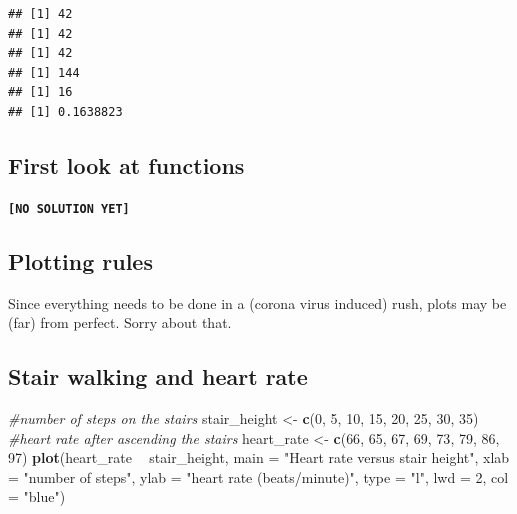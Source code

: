 \documentclass[]{book}
\newenvironment{Shaded}{\begin{snugshade}}{\end{snugshade}}
\newcommand{\CommentTok}[1]{\textcolor[rgb]{0.56,0.35,0.01}{\textit{#1}}}
\newcommand{\DataTypeTok}[1]{\textcolor[rgb]{0.13,0.29,0.53}{#1}}
\newcommand{\DecValTok}[1]{\textcolor[rgb]{0.00,0.00,0.81}{#1}}
\newcommand{\KeywordTok}[1]{\textcolor[rgb]{0.13,0.29,0.53}{\textbf{#1}}}
\newcommand{\NormalTok}[1]{#1}
\newcommand{\OperatorTok}[1]{\textcolor[rgb]{0.81,0.36,0.00}{\textbf{#1}}}
\newcommand{\StringTok}[1]{\textcolor[rgb]{0.31,0.60,0.02}{#1}}
\begin{document}
\begin{verbatim}
## [1] 42
## [1] 42
## [1] 42
## [1] 144
## [1] 16
## [1] 0.1638823
\end{verbatim}

\hypertarget{first-look-at-functions-1}{%
\subsection{First look at functions}\label{first-look-at-functions-1}}

\textbf{\texttt{{[}NO\ SOLUTION\ YET{]}}}

\hypertarget{plotting-rules-1}{%
\subsection*{Plotting rules}\label{plotting-rules-1}}

Since everything needs to be done in a (corona virus induced) rush, plots may be (far) from perfect. Sorry about that.

\hypertarget{stair-walking-and-heart-rate-1}{%
\subsection{Stair walking and heart rate}\label{stair-walking-and-heart-rate-1}}

\begin{Shaded}
\begin{Highlighting}[]
\CommentTok{#number of steps on the stairs}
\NormalTok{stair_height <-}\StringTok{ }\KeywordTok{c}\NormalTok{(}\DecValTok{0}\NormalTok{, }\DecValTok{5}\NormalTok{, }\DecValTok{10}\NormalTok{, }\DecValTok{15}\NormalTok{, }\DecValTok{20}\NormalTok{, }\DecValTok{25}\NormalTok{, }\DecValTok{30}\NormalTok{, }\DecValTok{35}\NormalTok{)}
\CommentTok{#heart rate after ascending the stairs}
\NormalTok{heart_rate <-}\StringTok{ }\KeywordTok{c}\NormalTok{(}\DecValTok{66}\NormalTok{, }\DecValTok{65}\NormalTok{, }\DecValTok{67}\NormalTok{, }\DecValTok{69}\NormalTok{, }\DecValTok{73}\NormalTok{, }\DecValTok{79}\NormalTok{, }\DecValTok{86}\NormalTok{, }\DecValTok{97}\NormalTok{)}
\KeywordTok{plot}\NormalTok{(heart_rate }\OperatorTok{~}\StringTok{ }\NormalTok{stair_height,}
      \DataTypeTok{main =} \StringTok{"Heart rate versus stair height"}\NormalTok{,}
      \DataTypeTok{xlab =} \StringTok{"number of steps"}\NormalTok{,}
      \DataTypeTok{ylab =} \StringTok{"heart rate (beats/minute)"}\NormalTok{,}
      \DataTypeTok{type =} \StringTok{"l"}\NormalTok{,}
      \DataTypeTok{lwd =} \DecValTok{2}\NormalTok{,}
      \DataTypeTok{col =} \StringTok{"blue"}\NormalTok{)}
\end{Highlighting}
\end{Shaded}
\end{document}
